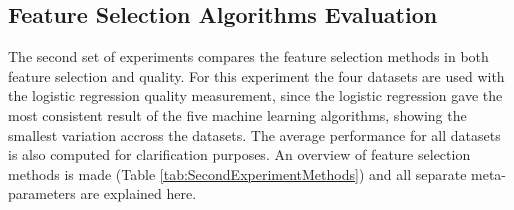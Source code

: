 \documentclass[10pt,a4paper]{report}
\begin{document}
	\subsection{Feature Selection Algorithms Evaluation}
	\label{FSsubsec:FeatureSelectionAlgorithmsEvaluation}
	
	The second set of experiments compares the feature selection methods in both feature selection and quality. For this experiment the four datasets are used with the logistic regression quality measurement, since the logistic regression gave the most consistent result of the five machine learning algorithms, showing the smallest variation accross the datasets. The average performance for all datasets is also computed for clarification purposes. An overview of feature selection methods is made (Table \ref{tab:SecondExperimentMethods}) and all separate meta-parameters are explained here.
	
\end{document}
